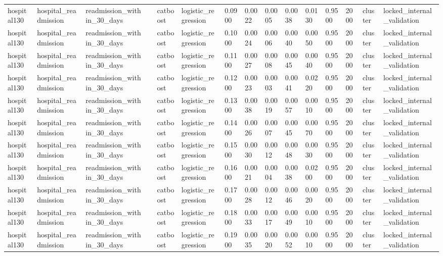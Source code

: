\begin{tabular}{lllllllllllllll}
hospital130 & hospital\_readmission & readmission\_within\_30\_days &  & catboost & logistic\_regression & 0.0900 & 0.0022 & 0.0005 & 0.0038 & 0.0130 & 0.9500 & 2000 & cluster & locked\_internal\_validation \\
hospital130 & hospital\_readmission & readmission\_within\_30\_days &  & catboost & logistic\_regression & 0.1000 & 0.0024 & 0.0006 & 0.0040 & 0.0050 & 0.9500 & 2000 & cluster & locked\_internal\_validation \\
hospital130 & hospital\_readmission & readmission\_within\_30\_days &  & catboost & logistic\_regression & 0.1100 & 0.0027 & 0.0008 & 0.0045 & 0.0040 & 0.9500 & 2000 & cluster & locked\_internal\_validation \\
hospital130 & hospital\_readmission & readmission\_within\_30\_days &  & catboost & logistic\_regression & 0.1200 & 0.0023 & 0.0003 & 0.0041 & 0.0220 & 0.9500 & 2000 & cluster & locked\_internal\_validation \\
hospital130 & hospital\_readmission & readmission\_within\_30\_days &  & catboost & logistic\_regression & 0.1300 & 0.0038 & 0.0019 & 0.0057 & 0.0010 & 0.9500 & 2000 & cluster & locked\_internal\_validation \\
hospital130 & hospital\_readmission & readmission\_within\_30\_days &  & catboost & logistic\_regression & 0.1400 & 0.0026 & 0.0007 & 0.0045 & 0.0070 & 0.9500 & 2000 & cluster & locked\_internal\_validation \\
hospital130 & hospital\_readmission & readmission\_within\_30\_days &  & catboost & logistic\_regression & 0.1500 & 0.0030 & 0.0012 & 0.0048 & 0.0030 & 0.9500 & 2000 & cluster & locked\_internal\_validation \\
hospital130 & hospital\_readmission & readmission\_within\_30\_days &  & catboost & logistic\_regression & 0.1600 & 0.0021 & 0.0004 & 0.0038 & 0.0200 & 0.9500 & 2000 & cluster & locked\_internal\_validation \\
hospital130 & hospital\_readmission & readmission\_within\_30\_days &  & catboost & logistic\_regression & 0.1700 & 0.0028 & 0.0012 & 0.0046 & 0.0020 & 0.9500 & 2000 & cluster & locked\_internal\_validation \\
hospital130 & hospital\_readmission & readmission\_within\_30\_days &  & catboost & logistic\_regression & 0.1800 & 0.0033 & 0.0017 & 0.0049 & 0.0010 & 0.9500 & 2000 & cluster & locked\_internal\_validation \\
hospital130 & hospital\_readmission & readmission\_within\_30\_days &  & catboost & logistic\_regression & 0.1900 & 0.0035 & 0.0020 & 0.0052 & 0.0010 & 0.9500 & 2000 & cluster & locked\_internal\_validation \\

\end{tabular}
